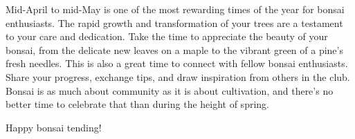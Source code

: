 {}
\noindent
Mid\--April to mid\--May is one of the most rewarding times of the year for bonsai enthusiasts.
The rapid growth and transformation of your trees are a testament to your care and dedication.
Take the time to appreciate the beauty of your bonsai, from the delicate new leaves on a maple to the vibrant green of a pine's fresh needles.
%
This is also a great time to connect with fellow bonsai enthusiasts.
Share your progress, exchange tips, and draw inspiration from others in the club.
Bonsai is as much about community as it is about cultivation, and there's no better time to celebrate that than during the height of spring.

Happy bonsai tending!
\closearticle
\pagebreak
